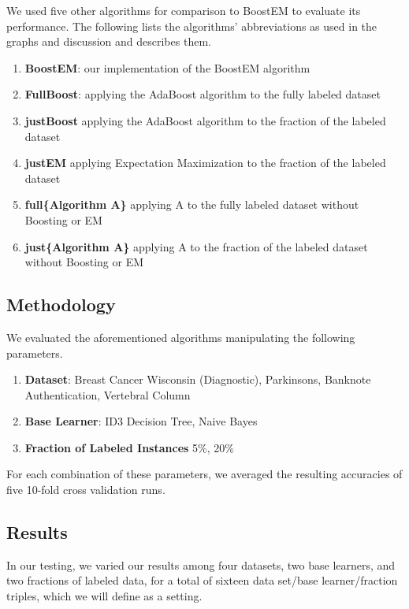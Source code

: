\documentclass{sig-alternate}
\begin{document}
We used five other algorithms for comparison to BoostEM to evaluate its performance. The following lists the algorithms' abbreviations as used in the graphs and discussion and describes them.

\begin{enumerate}
\item \textbf{BoostEM}: our implementation of the BoostEM algorithm
\item \textbf{FullBoost}: applying the AdaBoost algorithm to the fully labeled dataset
\item \textbf{justBoost} applying the AdaBoost algorithm to the fraction of the labeled dataset
\item \textbf{justEM} applying Expectation Maximization to the fraction of the labeled dataset
\item \textbf{full\{Algorithm A\}} applying A to the fully labeled dataset without Boosting or EM
\item \textbf{just\{Algorithm A\}} applying A to the fraction of the labeled dataset without Boosting or EM
\end{enumerate}

\subsection{Methodology}

We evaluated the aforementioned algorithms manipulating the following parameters.

\begin{enumerate}
\item \textbf{Dataset}: Breast Cancer Wisconsin (Diagnostic), Parkinsons, Banknote Authentication, Vertebral Column
\item \textbf{Base Learner}: ID3 Decision Tree, Naive Bayes
\item \textbf{Fraction of Labeled Instances} 5\%, 20\%
\end{enumerate}

For each combination of these parameters, we averaged the resulting accuracies of five 10-fold cross validation runs. 

\subsection{Results}

In our testing, we varied our results among four datasets, two base learners, and two fractions of labeled data, for a total of sixteen data set/base learner/fraction triples, which we will define as a setting.  
\end{document}

